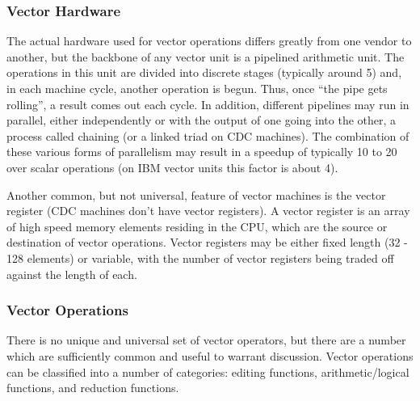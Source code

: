 \subsubsection{Vector Hardware }
The actual hardware used for vector operations differs greatly from
one vendor to another, but the backbone of any vector unit is a
pipelined arithmetic unit.  The operations in this unit are divided
into discrete stages (typically around 5) and, in each machine cycle,
another operation is begun.  Thus, once ``the pipe gets rolling'', a
result comes out each cycle.  In addition, different pipelines may run
in parallel, either independently or with the output of one going into
the other, a process called chaining (or a linked triad on CDC
machines). The combination of these various forms of parallelism may
result in a speedup of typically 10 to 20 over scalar operations (on
IBM vector units this factor is about 4).

Another common, but not universal, feature of vector machines is the
vector register (CDC machines don't have vector registers).  A vector
register is an array of high speed memory elements residing in the
CPU, which are the source or destination of vector operations. Vector
registers may be either fixed length (32 - 128 elements) or variable,
with the number of vector registers being traded off against the
length of each.

\subsubsection{Vector Operations }
There is no unique and universal set of vector operators, but there
are a number which are sufficiently common and useful to warrant
discussion.  Vector operations can be classified into a number of
categories: editing functions, arithmetic/logical functions, and
reduction functions.

